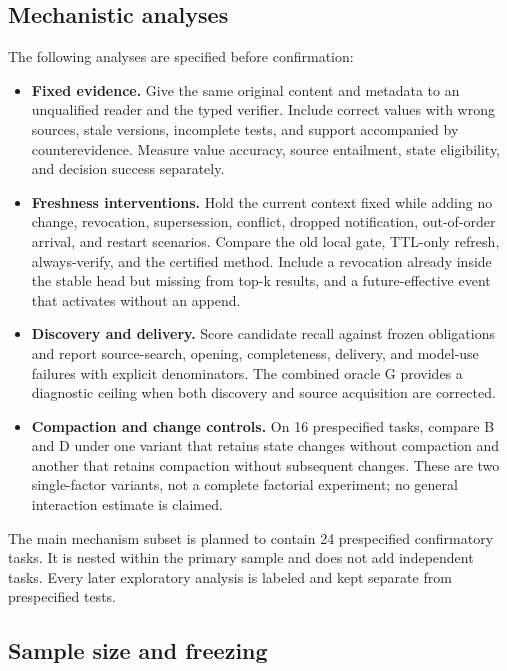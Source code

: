 \subsection{Mechanistic analyses}\label{mechanistic-analyses}

The following analyses are specified before confirmation:

\begin{itemize}
\tightlist
\item
  \textbf{Fixed evidence.} Give the same original content and metadata
  to an unqualified reader and the typed verifier. Include correct
  values with wrong sources, stale versions, incomplete tests, and
  support accompanied by counterevidence. Measure value accuracy, source
  entailment, state eligibility, and decision success separately.
\item
  \textbf{Freshness interventions.} Hold the current context fixed while
  adding no change, revocation, supersession, conflict, dropped
  notification, out-of-order arrival, and restart scenarios. Compare the
  old local gate, TTL-only refresh, always-verify, and the certified
  method. Include a revocation already inside the stable head but
  missing from top-k results, and a future-effective event that
  activates without an append.
\item
  \textbf{Discovery and delivery.} Score candidate recall against frozen
  obligations and report source-search, opening, completeness, delivery,
  and model-use failures with explicit denominators. The combined oracle
  G provides a diagnostic ceiling when both discovery and source
  acquisition are corrected.
\item
  \textbf{Compaction and change controls.} On 16 prespecified tasks,
  compare B and D under one variant that retains state changes without
  compaction and another that retains compaction without subsequent
  changes. These are two single-factor variants, not a complete
  factorial experiment; no general interaction estimate is claimed.
\end{itemize}

The main mechanism subset is planned to contain 24 prespecified
confirmatory tasks. It is nested within the primary sample and does not
add independent tasks. Every later exploratory analysis is labeled and
kept separate from prespecified tests.

\subsection{Sample size and freezing}\label{sample-size-and-freezing}

